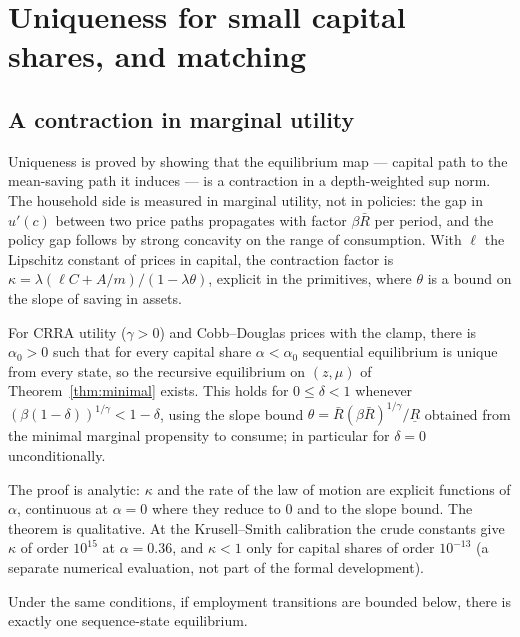 \section{Uniqueness for small capital shares, and matching}\label{sec:uniqueness}

\subsection{A contraction in marginal utility}

Uniqueness is proved by showing that the equilibrium map --- capital path to the mean-saving path it
induces --- is a contraction in a depth-weighted sup norm. The household side is measured in
marginal utility, not in policies: the gap in $u'(c)$ between two price paths propagates with factor
$\beta\bar R$ per period, and the policy gap follows by strong concavity on the range of
consumption. With $\ell$ the Lipschitz constant of prices in capital, the contraction factor is
$\kappa=\lambda(\ell C+A/m)/(1-\lambda\theta)$, explicit in the primitives, where $\theta$ is a bound
on the slope of saving in assets.

\begin{theorem}\label{thm:smallshare}
For CRRA utility ($\gamma>0$) and Cobb--Douglas prices with the clamp, there is $\alpha_0>0$ such
that for every capital share $\alpha<\alpha_0$ sequential equilibrium is unique from every state, so
the recursive equilibrium on $(z,\mu)$ of Theorem~\ref{thm:minimal} exists. This holds for
$0\le\delta<1$ whenever $(\beta(1-\delta))^{1/\gamma}<1-\delta$, using the slope bound
$\theta=\bar R(\beta\bar R)^{1/\gamma}/\underline R$ obtained from the minimal marginal propensity to
consume; in particular for $\delta=0$ unconditionally.
\end{theorem}

\noindent
The proof is analytic: $\kappa$ and the rate of the law of motion are explicit functions of $\alpha$,
continuous at $\alpha=0$ where they reduce to $0$ and to the slope bound. The theorem is
qualitative. At the Krusell--Smith calibration the crude constants give $\kappa$ of order $10^{15}$
at $\alpha=0.36$, and $\kappa<1$ only for capital shares of order $10^{-13}$ (a separate numerical
evaluation, not part of the formal development).

\begin{theorem}\label{thm:sequnique}
Under the same conditions, if employment transitions are bounded below, there is exactly one
sequence-state equilibrium.
\end{theorem}

